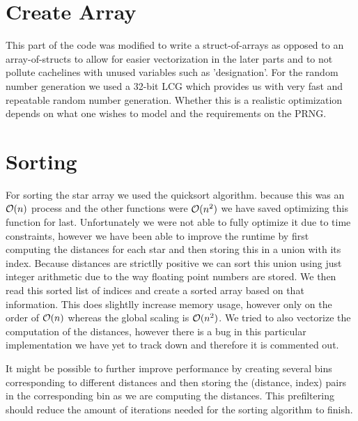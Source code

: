 \section{Create Array}
This part of the code was modified to write a struct-of-arrays as opposed to an array-of-structs to allow for easier vectorization in the later parts and to not pollute cachelines
with unused variables such as 'designation'. For the random number generation we used a 32-bit LCG which provides us with very fast and repeatable random number generation. Whether this is a
realistic optimization depends on what one wishes to model and the requirements on the PRNG.

\section{Sorting}
For sorting the star array we used the quicksort algorithm.
because this was an $\mathcal{O}(n)$ process and the other functions were $\mathcal{O}(n^2)$ we have saved optimizing this function for last.
Unfortunately we were not able to fully optimize it due to time constraints,
however we have been able to improve the runtime by first computing the distances for each star and then storing this in a union with its index. Because distances are strictlly positive we can sort this union using
just integer arithmetic due to the way floating point numbers are stored. We then read this sorted list of indices and create a sorted array based on that information. This does slightlly increase memory usage, however only on the order of
$\mathcal{O}(n)$ whereas the global scaling is $\mathcal{O}(n^2)$. We tried to also vectorize the computation of the distances, however there is a bug in this particular implementation we have yet to track down and therefore it is commented out.
\par It might be possible to further improve performance by creating several bins corresponding to different distances and then storing the (distance, index) pairs in the corresponding bin as we are computing the distances.
This prefiltering should reduce the amount of iterations needed for the sorting algorithm to finish.

